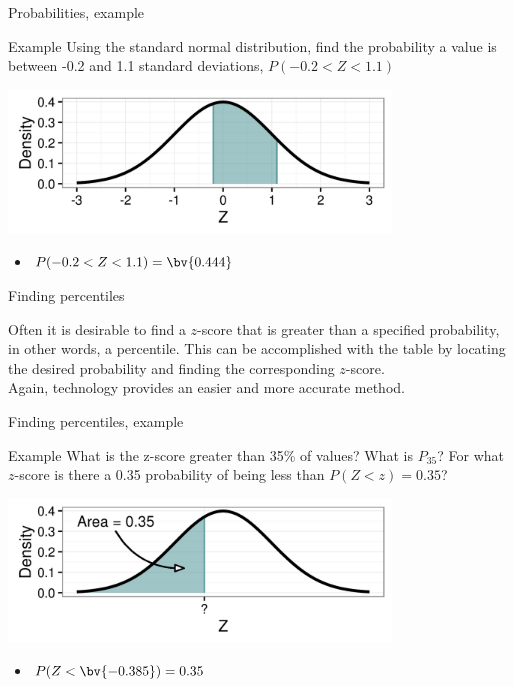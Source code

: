 \documentclass[xcolor=table]{beamer}
\begin{document}
\begin{frame}{Probabilities, example}
\begin{exampleblock}{Example}
Using the standard normal distribution, find the probability a value is between -0.2 and 1.1 standard deviations, $P(-0.2 < Z < 1.1)$\\
\smallskip
{\centering
\includegraphics[width=4in]{../images/ch6_ex03}
\par}
\begin{itemize}
\pause\item $P(-0.2 < Z < 1.1) = \bv{0.444}$
\end{itemize}
\end{exampleblock}
\end{frame}

\begin{frame}{Finding percentiles}
\begin{block}{}
Often it is desirable to find a $z$-score that is greater than a specified probability, in other words, a percentile. This can be accomplished with the table by locating the desired probability and finding the corresponding $z$-score.\\
\medskip
Again, technology provides an easier and more accurate method.
\end{block}
\end{frame}

\begin{frame}{Finding percentiles, example}
\begin{exampleblock}{Example}
What is the z-score greater than 35\% of values? What is $P_{35}$? For what $z$-score is there a 0.35 probability of being less than $P(Z < z) = 0.35$?\\
\smallskip
{\centering
\includegraphics[width=4in]{../images/ch6_ex04}
\par}

\begin{itemize}
\pause\item $P(Z < \bv{-0.385}) = 0.35$
\end{itemize}
\end{exampleblock}
\end{frame}
\end{document}
